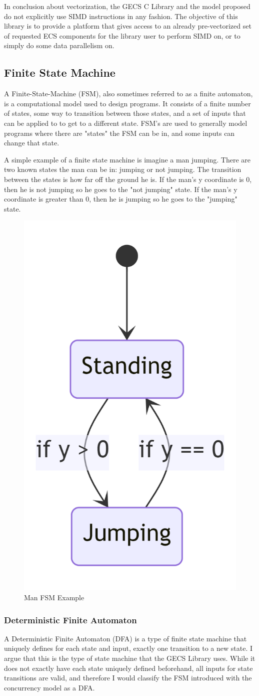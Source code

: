 In conclusion about vectorization, the GECS C Library and the model proposed do not explicitly use SIMD instructions in any fashion. The objective of this library is to provide a platform that gives access to an already pre-vectorized set of requested ECS components for the library user to perform SIMD on, or to simply do some data parallelism on.

\subsection{Finite State Machine}
A Finite-State-Machine (FSM), also sometimes referred to as a finite automaton, is a computational model used to design programs. It consists of a finite number of states, some way to transition between those states, and a set of inputs that can be applied to to get to a different state. FSM's are used to generally model programs where there are "states" the FSM can be in, and some inputs can change that state. 

A simple example of a finite state machine is imagine a man jumping. There are two known states the man can be in: jumping or not jumping. The transition between the states is how far off the ground he is. If the man's y coordinate is 0, then he is not jumping so he goes to the "not jumping" state. If the man's y coordinate is greater than 0, then he is jumping so he goes to the "jumping" state.

\begin{figure}[H]
    \centering
    \includegraphics[width=0.25\linewidth]{resources/man_fsm_example.png}
    \caption{Man FSM Example}
    \label{fig:graph2}
\end{figure}

\subsubsection{Deterministic Finite Automaton}
A Deterministic Finite Automaton (DFA) is a type of finite state machine that uniquely defines for each state and input, exactly one transition to a new state. I argue that this is the type of state machine that the GECS Library uses. While it does not exactly have each state uniquely defined beforehand, all inputs for state transitions are valid, and therefore I would classify the FSM introduced with the concurrency model as a DFA.

